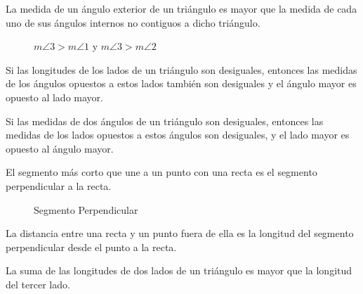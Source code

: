 \begin{theorem}
La medida de un ángulo exterior de un triángulo es mayor que la medida de cada uno de sus ángulos internos no contiguos a dicho triángulo.

    \begin{figure}[!h]
        \centering
        
        \caption{$m\angle{3} > m\angle{1}$ y $m\angle{3} > m\angle{2}$}
        \label{fig:intext-angles-diff}
    \end{figure}

\end{theorem}

\begin{theorem}
    Si las longitudes de los lados de un triángulo son desiguales, entonces las medidas de los ángulos opuestos a estos lados también son desiguales y el ángulo mayor es opuesto al lado mayor.

\end{theorem}

\begin{theorem}
    Si las medidas de dos ángulos de un triángulo son desiguales, entonces las medidas de los lados opuestos a estos ángulos son desiguales, y el lado mayor es opuesto al ángulo mayor.
\end{theorem}

\clearpage

\begin{theorem}
    El segmento más corto que une a un punto con una recta es el segmento perpendicular a la recta.

    \begin{figure}[!h]
        \centering
        
        \caption{Segmento Perpendicular}
        \label{fig:theorem6}
    \end{figure}
    
\end{theorem}

\begin{definition}
    La distancia entre una recta y un punto fuera de ella es la longitud del segmento perpendicular desde el punto a la recta.
\end{definition}

\begin{theorem}
    La suma de las longitudes de dos lados de un triángulo es mayor que la longitud del tercer lado.
\end{theorem}

